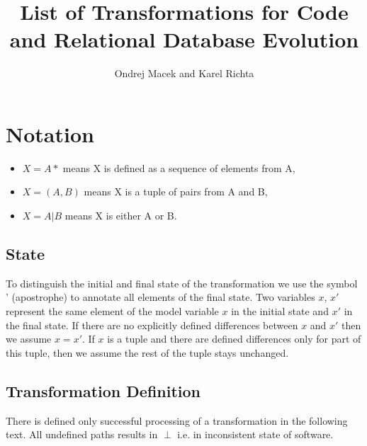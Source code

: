 \documentclass[10pt]{article}
\begin{document}
\title{List of Transformations for Code and Relational Database Evolution}
\author{Ondrej Macek and Karel Richta}
\maketitle

\tableofcontents \cleardoublepage

\section{Notation}

\begin{itemize}
    \item $X = A*$ means X is defined as a sequence of elements from A,
    \item $X = (A,B)$ means X is a tuple of pairs from A and B,
    \item $X = A | B$ means X is either A or B.
\end{itemize}

\subsection{State}
To distinguish the initial and final state of the transformation we use the symbol ' (apostrophe) to annotate all elements of the final state. Two variables $x$, $x'$ represent the same element of the model variable $x$ in the initial state and $x'$ in the final state. If there are no explicitly defined differences between $x$ and $x'$ then we assume $x = x'$. If $x$ is a tuple and there are defined differences only for part of this tuple, then we assume the rest of the tuple stays unchanged.

\subsection{Transformation Definition}
There is defined only successful processing of a transformation in the following text. All undefined paths results in $\perp$ i.e. in inconsistent state of software.


\end{document}
